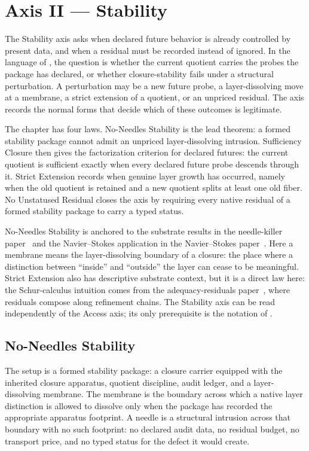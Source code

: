 \documentclass[11pt]{article}
\newcommand{\PaperAR}{the adequacy-residuals paper}
\newcommand{\PaperNeedleKiller}{the needle-killer paper}
\newcommand{\PaperNS}{the Navier--Stokes paper}
\theoremstyle{definition}
\begin{document}
  \section{Axis II — Stability}\label{sec:stability}

The Stability axis asks when declared future behavior is already
controlled by present data, and when a residual must be recorded
instead of ignored.  In the language of , the
question is whether the current quotient carries the probes the
package has declared, or whether closure-stability fails under a
structural perturbation.  A perturbation may be a new future probe,
a layer-dissolving move at a membrane, a strict extension of a
quotient, or an unpriced residual.  The axis records the normal
forms that decide which of these outcomes is legitimate.

The chapter has four laws.  No-Needles Stability is the lead theorem:
a formed stability package cannot admit an unpriced
layer-dissolving intrusion.  Sufficiency Closure then gives the
factorization criterion for declared futures: the current quotient is
sufficient exactly when every declared future probe descends through
it.  Strict Extension records when genuine layer growth has occurred,
namely when the old quotient is retained and a new quotient splits at
least one old fiber.  No Unstatused Residual closes the axis by
requiring every native residual of a formed stability package to
carry a typed status.

No-Needles Stability is anchored to the substrate results in
\PaperNeedleKiller\ \citep{Tsiokos2026NeedleKiller} and the
Navier--Stokes application in \PaperNS\
\citep{Tsiokos2026NavierStokes}.  Here a membrane means the
layer-dissolving boundary of a closure: the place where a distinction
between ``inside'' and ``outside'' the layer can cease to be
meaningful.  Strict Extension also has descriptive substrate context,
but it is a direct law here: the Schur-calculus intuition comes from
\PaperAR\ \citep{Tsiokos2026XiCompanion}, where residuals compose
along refinement chains.  The Stability axis can be read
independently of the Access axis; its only prerequisite is the
notation of .

\subsection{No-Needles Stability}\label{sec:stability:no-needles}

The setup is a formed stability package: a closure carrier equipped
with the inherited closure apparatus, quotient discipline, audit
ledger, and a layer-dissolving membrane.  The membrane is the
boundary across which a native layer distinction is allowed to
dissolve only when the package has recorded the appropriate
apparatus footprint.  A needle is a structural intrusion across that
boundary with no such footprint: no declared audit data, no residual
budget, no transport price, and no typed status for the defect it
would create.
\end{document}
